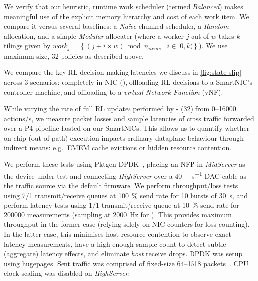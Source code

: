 We verify that our heuristic, runtime work scheduler (termed \emph{Balanced}) makes meaningful use of the explicit memory hierarchy and cost of each work item.
We compare it versus several baselines: a \emph{Na\"{i}ve} chunked scheduler, a \emph{Random} allocation, and a simple \emph{Modular} allocator (where a worker $j$ out of $w$ takes $k$ tilings given by $\mathit{work}_j=\left\{\left(j + i \times w\right) \bmod n_{\mathit{items}} \mid i \in [0,k) \right\}$).
We use maximum-size, \qty{32}{\bit} policies as described above.

We compare the key RL decision-making latencies we discuss in \cref{fig:state-slip} across 3 scenarios: completely in-NIC (\approachshort{}), offloading RL decisions to a SmartNIC's controller machine, and offloading to a \emph{virtual Network Function} (vNF).

While varying the rate of full RL updates performed by \approachshort{}-\Coopfw{} (\qty{32}{\bit}) from \numrange{0}{16000} actions/s, we measure packet losses and sample latencies of cross traffic forwarded over a P4 pipeline hosted on our SmartNICs.
This allows us to quantify whether on-chip (out-of-path) execution impacts ordinary dataplane behaviour through indirect means: e.g., EMEM cache evictions or hidden resource contention.

We perform these tests using Pktgen-DPDK~\cite{pktgen-dpdk}, placing an NFP in \emph{MidServer} as the device under test and connecting \emph{HighServer} over a \qty{40}{\giga\bit\per\second} DAC cable as the traffic source via the default firmware.
We perform throughput/loss tests using \num{7}/\num{1} transmit/receive queues at \qty{100}{\percent} send rate for 10 bursts of \qty{30}{\second}, and perform latency tests using \num{1}/\num{1} transmit/receive queue at \qty{10}{\percent} send rate for \num{200000} measurements (sampling at \qty{2000}{\hertz} for ).
This provides maximum throughput in the former case (relying solely on NIC counters for loss counting).
In the latter case, this minimises host resource contention to observe exact latency measurements, have a high enough sample count to detect subtle (aggregate) latency effects, and eliminate \emph{host} receive drops.
DPDK was setup using  hugepages.
Sent traffic was comprised of fixed-size \qtyrange{64}{1518}{\byte} packets~\cite{rfc2544}.
CPU clock scaling was disabled on \emph{HighServer}.

